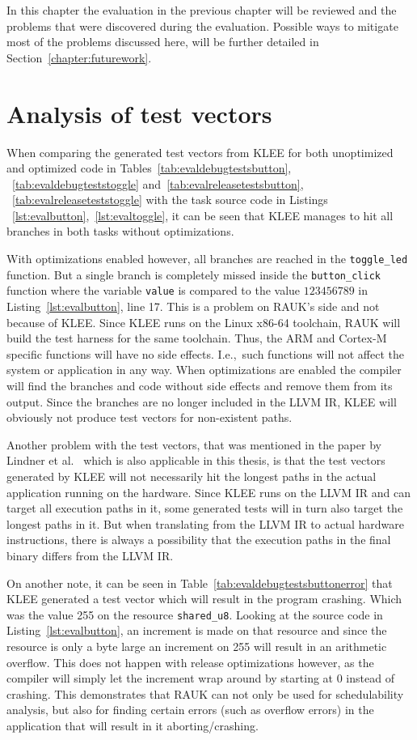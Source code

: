 In this chapter the evaluation in the previous chapter will be reviewed
and the problems that were discovered during the evaluation. Possible
ways to mitigate most of the problems discussed here, will be further detailed
in Section~\ref{chapter:futurework}.

\section{Analysis of test vectors}
\label{discussion:analysis}
When comparing the generated test vectors from KLEE for both unoptimized and
optimized code in Tables~\ref{tab:evaldebugtestsbutton},
~\ref{tab:evaldebugteststoggle} and~\ref{tab:evalreleasetestsbutton},
~\ref{tab:evalreleaseteststoggle} with the task source code in Listings
~\ref{lst:evalbutton},~\ref{lst:evaltoggle}, it can be seen that KLEE manages to
hit all branches in both tasks without optimizations. 

With optimizations enabled however, all branches are reached in the
\texttt{toggle\_led} function. But a single branch is completely missed inside
the \texttt{button\_click} function where the variable \texttt{value} is
compared to the value $123456789$ in Listing~\ref{lst:evalbutton}, line 17.
This is a problem on RAUK's side and not because of KLEE\@. Since KLEE runs on
the Linux x86-64 toolchain, RAUK will build the test harness for the same
toolchain. Thus, the ARM and Cortex-M specific functions will have no side
effects. I.e.,\ such functions will not affect the system or application in any
way. When optimizations are enabled the compiler will find the branches and
code without side effects and remove them from its output. Since the branches
are no longer included in the LLVM IR, KLEE will obviously not produce test
vectors for non-existent paths.

Another problem with the test vectors, that was mentioned in the paper by
Lindner et al.\ \cite{lindner} which is also applicable in this thesis, is that
the test vectors generated by KLEE will not necessarily hit the longest paths
in the actual application running on the hardware. Since KLEE runs on the LLVM
IR and can target all execution paths in it, some generated tests will
in turn also target the longest paths in it. But when translating from the LLVM
IR to actual hardware instructions, there is always a possibility that the
execution paths in the final binary differs from the LLVM IR\@.

On another note, it can be seen in Table~\ref{tab:evaldebugtestsbuttonerror}
that KLEE generated a test vector which will result in the program crashing.
Which was the value 255 on the resource \texttt{shared\_u8}. Looking at the
source code in Listing~\ref{lst:evalbutton}, an increment is made on that
resource and since the resource is only a byte large an increment on 255 will
result in an arithmetic overflow. This does not happen with release
optimizations however, as the compiler will simply let the increment wrap
around by starting at 0 instead of crashing. This demonstrates that RAUK
can not only be used for schedulability analysis, but also for finding
certain errors (such as overflow errors) in the application that will result
in it aborting/crashing.

